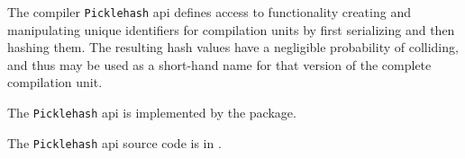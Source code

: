
The compiler {\tt Picklehash} api defines access to functionality creating and 
manipulating unique identifiers for compilation units by first serializing  
and then hashing them.  The resulting hash values have a negligible probability 
of colliding, and thus may be used as a short-hand name for that version of 
the complete compilation unit.

The {\tt Picklehash} api is implemented by the  package.

The {\tt Picklehash} api source code is in .

